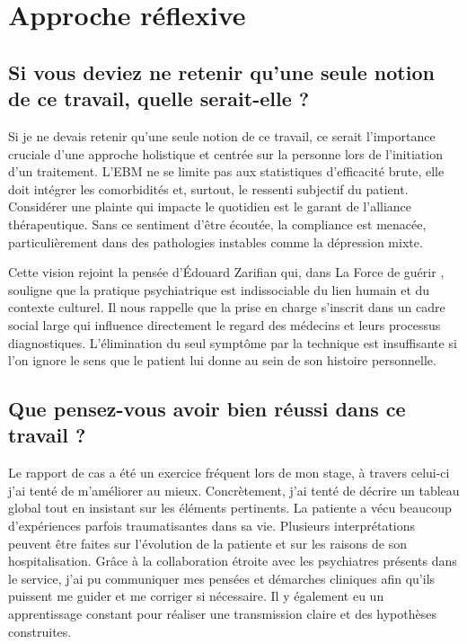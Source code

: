 \section{Approche réflexive}

\subsection{Si vous deviez ne retenir qu’une seule notion de ce travail, quelle serait-elle ?}
Si je ne devais retenir qu’une seule notion de ce travail, ce serait l’importance cruciale d’une approche holistique et centrée sur la personne lors de l’initiation d’un traitement. L’EBM ne se limite pas aux statistiques d’efficacité brute, elle doit intégrer les comorbidités et, surtout, le ressenti subjectif du patient. Considérer une plainte qui impacte le quotidien est le garant de l’alliance thérapeutique. Sans ce sentiment d’être écoutée, la compliance est menacée, particulièrement dans des pathologies instables comme la dépression mixte.

Cette vision rejoint la pensée d’Édouard Zarifian qui, dans La Force de guérir \parencite{zarifian1999force}, souligne que la pratique psychiatrique est indissociable du lien humain et du contexte culturel. Il nous rappelle que la prise en charge s'inscrit dans un cadre social large qui influence directement le regard des médecins et leurs processus diagnostiques. L'élimination du seul symptôme par la technique est insuffisante si l'on ignore le sens que le patient lui donne au sein de son histoire personnelle.

\subsection{Que pensez-vous avoir bien réussi dans ce travail ?}
Le rapport de cas a été un exercice fréquent lors de mon stage, à travers celui-ci j’ai tenté de m’améliorer au mieux. Concrètement, j'ai tenté de décrire un tableau global tout en insistant sur les éléments pertinents. La patiente a vécu beaucoup d’expériences parfois traumatisantes dans sa vie. Plusieurs interprétations peuvent être faites sur l’évolution de la patiente et sur les raisons de son hospitalisation. Grâce à la collaboration étroite avec les psychiatres présents dans le service, j’ai pu communiquer mes pensées et démarches cliniques afin qu’ils puissent me guider et me corriger si nécessaire. Il y également eu un apprentissage constant pour réaliser une transmission claire et des hypothèses construites. 

